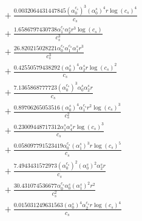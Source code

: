 \documentclass[10pt]{article}
\begin{document}
\begin{align*}
&{}  + \frac{0.0032064431447845 \left(\alpha_{0}^{c_s}\right)^{3} \left(\alpha_{0}^s\right)^{4} r \log{\left(c_{s} \right)}^{4}}{c_{s}} \\
&{}  + \frac{1.6586797430738 \alpha_{1}^{c_s} \alpha_{2}^s r^{3} \log{\left(c_{s} \right)}}{c_{s}^{3}} \\
&{}  + \frac{26.820215028221 \alpha_{0}^{c_s} \alpha_{1}^{c_s} \alpha_{1}^s r^{3}}{c_{s}^{3}} \\
&{}  + \frac{0.42550579438292 \left(\alpha_{0}^s\right)^{4} \alpha_{2}^s r \log{\left(c_{s} \right)}^{2}}{c_{s}} \\
&{}  + \frac{7.1365868777723 \left(\alpha_{0}^{c_s}\right)^{3} \alpha_{0}^s \alpha_{2}^s r}{c_{s}} \\
&{}  + \frac{0.89706265053516 \left(\alpha_{0}^s\right)^{4} \alpha_{1}^{c_s} r^{2} \log{\left(c_{s} \right)}^{3}}{c_{s}^{2}} \\
&{}  + \frac{0.23009448717312 \alpha_{1}^s \alpha_{4}^s r \log{\left(c_{s} \right)}^{3}}{c_{s}} \\
&{}  + \frac{0.058097791523419 \alpha_{0}^{c_s} \left(\alpha_{1}^s\right)^{3} r \log{\left(c_{s} \right)}^{5}}{c_{s}} \\
&{}  + \frac{7.4943431572973 \left(\alpha_{0}^{c_s}\right)^{2} \left(\alpha_{0}^s\right)^{2} \alpha_{2}^s r}{c_{s}} \\
&{}  + \frac{30.431074536677 \alpha_{0}^{c_s} \alpha_{0}^s \left(\alpha_{1}^s\right)^{2} r^{2}}{c_{s}^{2}} \\
&{}  + \frac{0.015031249631563 \left(\alpha_{0}^s\right)^{4} \alpha_{2}^{c_s} r \log{\left(c_{s} \right)}^{4}}{c_{s}}
\end{align*}
\end{document}
